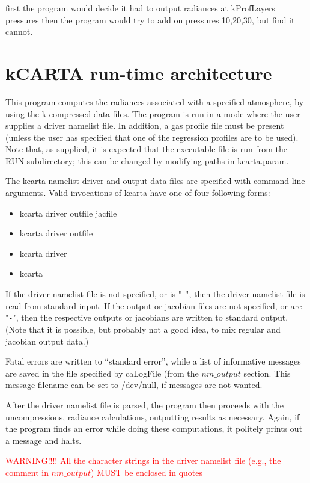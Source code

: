 \documentclass[12pt]{article}
\newcommand{\kc}{\textsf{kCARTA}\xspace}
\begin{document}
{{{\medskip\noindent 
first the program would decide it had to output radiances at kProfLayers
pressures then the program would try to add on pressures 10,20,30,
but find it cannot.

\section{\kc run-time architecture}

This program computes the radiances associated with a specified
atmosphere, by using the k-compressed data files.  The program is
run in a mode where the user supplies a driver namelist file.  In addition, a
gas profile file must be present (unless the user has specified that
one of the regression profiles are to be used).  Note that, as
supplied, it is expected that the executable file is run from the
RUN subdirectory; this can be changed by modifying paths in
kcarta.param.

The kcarta namelist driver and output data files are specified with command
line arguments.  Valid invocations of kcarta have one of four
following forms:

\begin{itemize}
  \item kcarta driver outfile jacfile
  \item kcarta driver outfile
  \item kcarta driver   
  \item kcarta
\end{itemize}

If the driver namelist file is not specified, or is "{\tt -}", then the
driver namelist file is read from standard input.  If the output or jacobian
files are not specified, or are "{\tt -}", then the respective
outputs or jacobians are written to standard output.  (Note that it
is possible, but probably not a good idea, to mix regular and
jacobian output data.)

Fatal errors are written to ``standard error'', while a list of
informative messages are saved in the file specified by caLogFile (from the 
$nm\_output$ section. This message filename can be set to /dev/null,
if messages are not wanted.

After the driver namelist file is parsed, the program then proceeds with the
uncompressions, radiance calculations, outputting results as
necessary.  Again, if the program finds an error while doing these
computations, it politely prints out a message and halts.

\textcolor{red}
{WARNING!!!! All the character strings in the driver namelist file (e.g., the
comment in $nm\_output$) MUST be enclosed in quotes}

}}}
\end{document}
